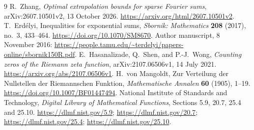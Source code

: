 \documentclass[11pt]{article}
\theoremstyle{remark}
\begin{document}
\begin{thebibliography}{9}
R.~Zhang, \emph{Optimal extrapolation bounds for sparse Fourier sums},
arXiv:2607.10501v2, 13 October 2026.
\url{https://arxiv.org/html/2607.10501v2}.
T.~Erd\'elyi, Inequalities for exponential sums,
\emph{Sbornik: Mathematics} \textbf{208} (2017), no.~3, 433--464.
\url{https://doi.org/10.1070/SM8670}.
Author manuscript, 8 November 2016:
\url{https://people.tamu.edu/~terdelyi/papers-online/sbornik150R.pdf}.
E.~Hasanalizade, Q.~Shen, and P.-J.~Wong,
\emph{Counting zeros of the Riemann zeta function},
arXiv:2107.06506v1, 14 July 2021.
\url{https://arxiv.org/abs/2107.06506v1}.
H.~von Mangoldt, Zur Verteilung der Nullstellen der Riemannschen Funktion,
\emph{Mathematische Annalen} \textbf{60} (1905), 1--19.
\url{https://doi.org/10.1007/BF01447494}.
National Institute of Standards and Technology,
\emph{Digital Library of Mathematical Functions},
Sections 5.9, 20.7, 25.4 and 25.10.
\url{https://dlmf.nist.gov/5.9};
\url{https://dlmf.nist.gov/20.7};
\url{https://dlmf.nist.gov/25.4};
\url{https://dlmf.nist.gov/25.10}.
\end{thebibliography}
\end{document}
